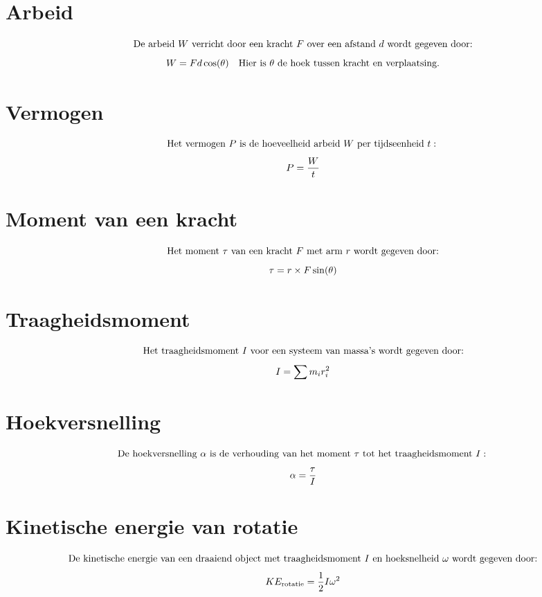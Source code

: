 \documentclass{article}
\begin{document}
\section*{Arbeid}
\[ \text{De arbeid } W \text{ verricht door een kracht } F \text{ over een afstand } d \text{ wordt gegeven door:} \\
\]
\[ W = Fd \cos(\theta) \quad \text{Hier is } \theta \text{ de hoek tussen kracht en verplaatsing.} \\
\]

\section*{Vermogen}
\[ \text{Het vermogen } P \text{ is de hoeveelheid arbeid } W \text{ per tijdseenheid } t: \\
\]
\[ P = \frac{W}{t} \\
\]

\section*{Moment van een kracht}
\[ \text{Het moment } \tau \text{ van een kracht } F \text{ met arm } r \text{ wordt gegeven door:} \\
\]
\[ \tau = r \times F \sin(\theta) \\
\]

\section*{Traagheidsmoment}
\[ \text{Het traagheidsmoment } I \text{ voor een systeem van massa's wordt gegeven door:} \\
\]
\[ I = \sum m_i r_i^2 \\
\]

\section*{Hoekversnelling}
\[ \text{De hoekversnelling } \alpha \text{ is de verhouding van het moment } \tau \text{ tot het traagheidsmoment } I: \\
\]
\[ \alpha = \frac{\tau}{I} \\
\]

\section*{Kinetische energie van rotatie}
\[ \text{De kinetische energie van een draaiend object met traagheidsmoment } I \text{ en hoeksnelheid } \omega \text{ wordt gegeven door:} \\
\]
\[ KE_{\text{rotatie}} = \frac{1}{2} I \omega^2 \\
\]
\end{document}
